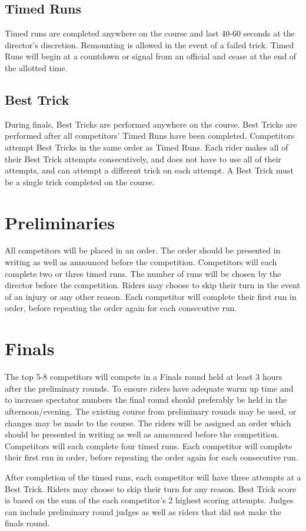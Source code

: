 \subsection{Timed Runs}
Timed runs are completed anywhere on the course and last 40-60 seconds at the director's discretion.
Remounting is allowed in the event of a failed trick.
Timed Runs will begin at a countdown or signal from an official and cease at the end of the allotted time.

\subsection{Best Trick}
During finals, Best Tricks are performed anywhere on the course.
Best Tricks are performed after all competitors' Timed Runs have been completed.
Competitors attempt Best Tricks in the same order as Timed Runs.
Each rider makes all of their Best Trick attempts consecutively, and does not have to use all of their attempts, and can attempt a different trick on each attempt.
A Best Trick must be a single trick completed on the course.

\section{Preliminaries}
All competitors will be placed in an order.
The order should be presented in writing as well as announced before the competition.
Competitors will each complete two or three timed runs.
The number of runs will be chosen by the director before the competition.
Riders may choose to skip their turn in the event of an injury or any other reason.
Each competitor will complete their first run in order, before repeating the order again for each consecutive run.

\section{Finals}
The top 5-8 competitors will compete in a Finals round held at least 3 hours after the preliminary rounds.
To ensure riders have adequate warm up time and to increase spectator numbers the final round should preferably be held in the afternoon/evening.
The existing course from preliminary rounds may be used, or changes may be made to the course.
The riders will be assigned an order which should be presented in writing as well as announced before the competition.
Competitors will each complete four timed runs.
Each competitor will complete their first run in order, before repeating the order again for each consecutive run.

After completion of the timed runs, each competitor will have three attempts at a Best Trick.
Riders may choose to skip their turn for any reason.
Best Trick score is based on the sum of the each competitor's 2 highest scoring attempts.
Judges can include preliminary round judges as well as riders that did not make the finals round.
